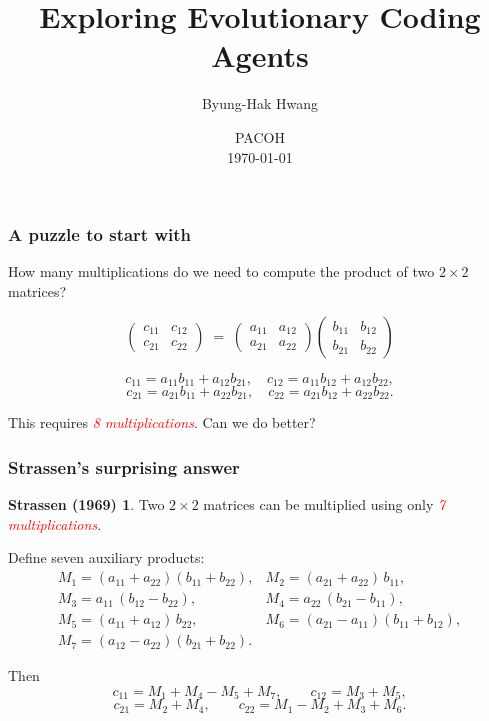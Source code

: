\documentclass{beamer}
\title{Exploring Evolutionary Coding Agents}
\author{Byung-Hak Hwang}
\institute[KIAS]{Center for AI and Natural Sciences, KIAS}
\date[PACOH]{PACOH \\ \today}
\theoremstyle{definition}
\newtheorem*{Strassen}{Strassen (1969)}
\newcommand\remph[1]{\emph{\textcolor{red}{#1}}}
\begin{document}
\begin{frame}
  \titlepage
\end{frame}


\begin{frame}
  \frametitle{A puzzle to start with}
  How many multiplications do we need to compute the product of two
  \( 2 \times 2 \) matrices?
  \pause
  \vspace{.3cm}

  \[
    \begin{pmatrix} c_{11} & c_{12} \\ c_{21} & c_{22} \end{pmatrix}
    \;=\;
    \begin{pmatrix} a_{11} & a_{12} \\ a_{21} & a_{22} \end{pmatrix}
    \begin{pmatrix} b_{11} & b_{12} \\ b_{21} & b_{22} \end{pmatrix}
  \]
  \pause
  \vspace{.2cm}

  \[
    c_{11} = a_{11}b_{11} + a_{12}b_{21}, \quad
    c_{12} = a_{11}b_{12} + a_{12}b_{22},
  \]
  \[
    c_{21} = a_{21}b_{11} + a_{22}b_{21}, \quad
    c_{22} = a_{21}b_{12} + a_{22}b_{22}.
  \]
  \pause
  \vspace{.2cm}

  This requires \remph{8 multiplications}. \pause
  Can we do better?
\end{frame}


\begin{frame}
  \frametitle{Strassen's surprising answer}
  \begin{Strassen}
    Two \( 2 \times 2 \) matrices can be multiplied using only
    \remph{7 multiplications}.
  \end{Strassen}
  \pause

  Define seven auxiliary products:
  \[
    \begin{array}{ll}
      M_1 = (a_{11} + a_{22})(b_{11} + b_{22}), &
      M_2 = (a_{21} + a_{22})\, b_{11}, \\[.2em]
      M_3 = a_{11}\,(b_{12} - b_{22}), &
      M_4 = a_{22}\,(b_{21} - b_{11}), \\[.2em]
      M_5 = (a_{11} + a_{12})\, b_{22}, &
      M_6 = (a_{21} - a_{11})(b_{11} + b_{12}), \\[.2em]
      M_7 = (a_{12} - a_{22})(b_{21} + b_{22}). &
    \end{array}
  \]
  \pause

  Then
  \[
    c_{11} = M_1 + M_4 - M_5 + M_7, \qquad c_{12} = M_3 + M_5,
  \]
  \[
    c_{21} = M_2 + M_4, \qquad c_{22} = M_1 - M_2 + M_3 + M_6.
  \]
\end{frame}
\end{document}
